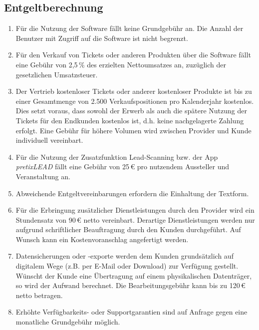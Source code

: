 \documentclass{terms}
\begin{document}
\subsection{Entgeltberechnung}
\label{entgelt}
\begin{enumerate}
\item Für die Nutzung der Software fällt keine Grundgebühr an. Die Anzahl der Benutzer mit Zugriff auf die Software ist nicht begrenzt.
\item Für den Verkauf von Tickets oder anderen Produkten über die Software fällt eine Gebühr von 2,5\,\% des erzielten Nettoumsatzes an, zuzüglich der gesetzlichen Umsatzsteuer.
\item Der Vertrieb kostenloser Tickets oder anderer kostenloser Produkte ist bis zu einer Gesamtmenge von 2.500 Verkaufspositionen pro Kalenderjahr kostenlos. Dies setzt voraus, dass sowohl der Erwerb als auch die spätere Nutzung der Tickets für den Endkunden kostenlos ist, d.h. keine nachgelagerte Zahlung erfolgt. Eine Gebühr für höhere Volumen wird zwischen Provider und Kunde individuell vereinbart.
\item Für die Nutzung der Zusatzfunktion Lead-Scanning bzw. der App \emph{pretixLEAD} fällt eine Gebühr von 25\,€ pro nutzendem Aussteller und Veranstaltung an.
\item Abweichende Entgeltvereinbarungen erfordern die Einhaltung der Textform.
\item Für die Erbringung zusätzlicher Dienstleistungen durch den Provider wird ein Stundensatz von 90\,€ netto vereinbart. Derartige Dienstleistungen werden nur aufgrund schriftlicher Beauftragung durch den Kunden durchgeführt. Auf Wunsch kann ein Kostenvoranschlag angefertigt werden.
\item Datensicherungen oder -exporte werden dem Kunden grundsätzlich auf digitalem Wege (z.B. per E-Mail oder Download) zur Verfügung gestellt. Wünscht der Kunde eine Übertragung auf einem physikalischen Datenträger, so wird der Aufwand berechnet. Die Bearbeitungsgebühr kann bis zu 120\,€ netto betragen.
\item Erhöhte Verfügbarkeits- oder Supportgarantien sind auf Anfrage gegen eine monatliche Grundgebühr möglich.
\end{enumerate}
\end{document}
